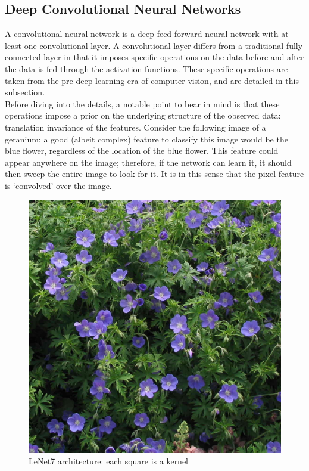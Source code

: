 \documentclass[a4paper,11pt]{article}
\begin{document}
\clearpage

\subsection{Deep Convolutional Neural Networks}

A convolutional neural network is a deep feed-forward neural network with at least one convolutional layer. A convolutional layer differs from a traditional fully connected layer in that it imposes specific operations on the data before and after the data is fed through the activation functions. These specific operations are taken from the pre deep learning era of computer vision, and are detailed in this subsection. \\

Before diving into the details, a notable point to bear in mind is that these operations impose a prior on the underlying structure of the observed data: translation invariance of the features. Consider the following image of a geranium: a good (albeit complex) feature to classify this image would be the blue flower, regardless of the location of the blue flower. This feature could appear anywhere on the image; therefore, if the network can learn it, it should then sweep the entire image to look for it. It is in this sense that the pixel feature is `convolved' over the image. \\

\begin{figure}[h!]
	\centering
	\includegraphics[scale=0.2]{images/geranium.jpg}
	\caption{LeNet7 architecture: each square is a kernel}
\end{figure}
\end{document}
